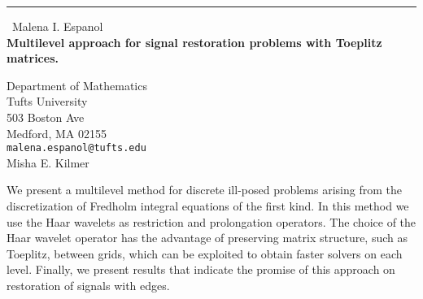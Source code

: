 \documentclass{report}
\begin{document}
\begin{center}
\rule{6in}{1pt} \
{\large Malena I. Espanol \\
{\bf Multilevel approach for signal restoration problems with Toeplitz matrices.}}

Department of Mathematics \\ Tufts University \\
503 Boston Ave \\
Medford, MA 02155 \\
{\tt malena.espanol@tufts.edu} \\
Misha E. Kilmer
\end{center}

We present a multilevel method for discrete ill-posed problems arising from the
discretization of Fredholm integral equations of the first kind. In
this method we use the Haar wavelets as restriction and prolongation
operators. The choice of the Haar wavelet operator has the advantage
of preserving matrix structure, such as Toeplitz, between grids, which
can be exploited to obtain faster solvers on each level. Finally,
we present results that indicate the promise of this approach on restoration of signals with edges.
\end{document}
